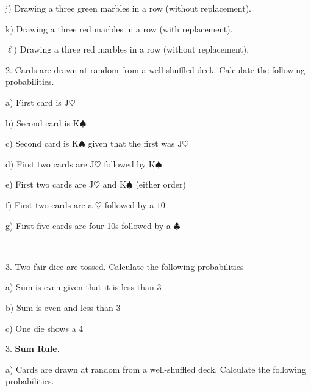 \documentclass[10pt]{article}
\begin{document}
\hspace{20pt} j) Drawing a three green marbles in a row
  (without replacement).
\bigskip

\hspace{20pt} k) Drawing a three red marbles in a row
  (with replacement).
\bigskip

\hspace{20pt} $\ell$) Drawing a three red marbles in a row
  (without replacement).
\bigskip

2. Cards are drawn at random from a well-shuffled deck.
Calculate the following probabilities.
\medskip

\hspace{20pt} a) First card is $\mbox{J}\heartsuit$
\bigskip

\hspace{20pt} b) Second card is $\mbox{K}\spadesuit$
\bigskip

\hspace{20pt} c) Second card is $\mbox{K}\spadesuit$ given that 
the first was $\mbox{J}\heartsuit$
\bigskip

\hspace{20pt} d) First two cards are $\mbox{J}\heartsuit$ followed by $\mbox{K}\spadesuit$
\bigskip

\hspace{20pt} e) First two cards are $\mbox{J}\heartsuit$ 
and $\mbox{K}\spadesuit$ (either order)
\bigskip

\hspace{20pt} f) First two cards are a $\heartsuit$ followed by a $10$
\bigskip

\hspace{20pt} g) First five cards are four 10s followed by a $\clubsuit$
\vfill
\eject


{\ }

3. Two fair dice are tossed. Calculate the following probabilities
\medskip

\hspace{20pt} a) Sum is even given that it is less than 3
\bigskip

\hspace{20pt} b) Sum is even and less than 3
\bigskip

\hspace{20pt} c) One die shows a 4
\bigskip
\bigskip


3. \textbf{Sum Rule}.

\hspace{20pt} a) Cards are drawn at random from a well-shuffled deck.
Calculate the following probabilities.
\medskip
\bigskip
\end{document}
